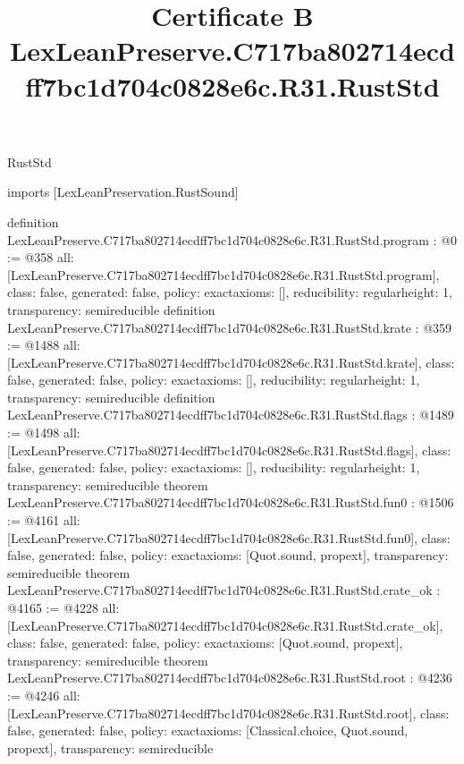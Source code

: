 \begin{lexlean}{RustStd}
\title{Certificate B LexLeanPreserve.C717ba802714ecdff7bc1d704c0828e6c.R31.RustStd}
\begin{coremodule}
imports [LexLeanPreservation.RustSound]

definition LexLeanPreserve.C717ba802714ecdff7bc1d704c0828e6c.R31.RustStd.program : @0 := @358 {
  all: [LexLeanPreserve.C717ba802714ecdff7bc1d704c0828e6c.R31.RustStd.program],
  class: false,
  generated: false,
  policy: exact{axioms: []},
  reducibility: regular{height: 1},
  transparency: semireducible
}
definition LexLeanPreserve.C717ba802714ecdff7bc1d704c0828e6c.R31.RustStd.krate : @359 := @1488 {
  all: [LexLeanPreserve.C717ba802714ecdff7bc1d704c0828e6c.R31.RustStd.krate],
  class: false,
  generated: false,
  policy: exact{axioms: []},
  reducibility: regular{height: 1},
  transparency: semireducible
}
definition LexLeanPreserve.C717ba802714ecdff7bc1d704c0828e6c.R31.RustStd.flags : @1489 := @1498 {
  all: [LexLeanPreserve.C717ba802714ecdff7bc1d704c0828e6c.R31.RustStd.flags],
  class: false,
  generated: false,
  policy: exact{axioms: []},
  reducibility: regular{height: 1},
  transparency: semireducible
}
theorem LexLeanPreserve.C717ba802714ecdff7bc1d704c0828e6c.R31.RustStd.fun0 : @1506 := @4161 {
  all: [LexLeanPreserve.C717ba802714ecdff7bc1d704c0828e6c.R31.RustStd.fun0],
  class: false,
  generated: false,
  policy: exact{axioms: [Quot.sound, propext]},
  transparency: semireducible
}
theorem LexLeanPreserve.C717ba802714ecdff7bc1d704c0828e6c.R31.RustStd.crate_ok : @4165 := @4228 {
  all: [LexLeanPreserve.C717ba802714ecdff7bc1d704c0828e6c.R31.RustStd.crate_ok],
  class: false,
  generated: false,
  policy: exact{axioms: [Quot.sound, propext]},
  transparency: semireducible
}
theorem LexLeanPreserve.C717ba802714ecdff7bc1d704c0828e6c.R31.RustStd.root : @4236 := @4246 {
  all: [LexLeanPreserve.C717ba802714ecdff7bc1d704c0828e6c.R31.RustStd.root],
  class: false,
  generated: false,
  policy: exact{axioms: [Classical.choice, Quot.sound, propext]},
  transparency: semireducible
}


\end{coremodule}
\end{lexlean}
